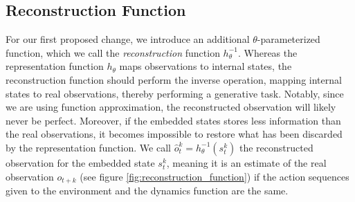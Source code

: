 \newcommand{\reconstruction}{h^{-1}}

\subsection{Reconstruction Function}
For our first proposed change, we introduce an additional $\theta$-parameterized function, which we call the \textit{reconstruction} function $\reconstruction_\theta$. Whereas the representation function $h_\theta$ maps observations to internal states, the reconstruction function should perform the inverse operation, mapping internal states to real observations, thereby performing a generative task. Notably, since we are using function approximation, the reconstructed observation will likely never be perfect. Moreover, if the embedded states stores less information than the real observations, it becomes impossible to restore what has been discarded by the representation function. We call $\hat{o}^k_t = \reconstruction_\theta(s^k_t)$ the reconstructed observation for the embedded state $s^k_t$, meaning it is an estimate of the real observation $o_{t+k}$ (see figure \ref{fig:reconstruction_function}) if the action sequences given to the environment and the dynamics function are the same.
